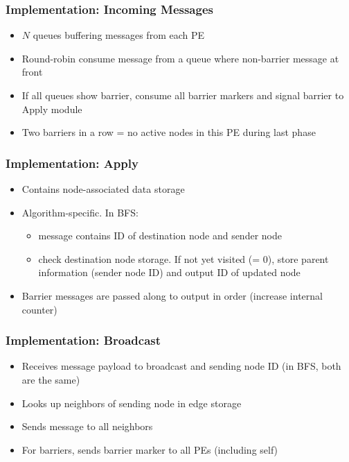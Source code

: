\documentclass[14pt]{beamer}
\begin{document}
\begin{frame}
\begin{minipage}{0.3\textwidth}
	\end{minipage}
\end{frame}

\begin{frame}
	\frametitle{Implementation: Incoming Messages}
	\begin{itemize}
		\addtolength{\itemsep}{0.5\baselineskip}
		\item $N$ queues buffering messages from each PE
		\item Round-robin consume message from a queue where non-barrier message at front
		\item If all queues show barrier, consume all barrier markers and signal barrier to Apply module
		\item Two barriers in a row = no active nodes in this PE during last phase
	\end{itemize}
\end{frame}

\begin{frame}
	\frametitle{Implementation: Apply}
	\begin{itemize}
		\addtolength{\itemsep}{0.5\baselineskip}
		\item Contains node-associated data storage
		\item Algorithm-specific. In BFS:
		\begin{itemize}
			\item message contains ID of destination node and sender node
			\item check destination node storage. If not yet visited (= 0), store parent information (sender node ID) and output ID of updated node
		\end{itemize}
		\item Barrier messages are passed along to output in order (increase internal counter)
	\end{itemize}
\end{frame}

\begin{frame}
	\frametitle{Implementation: Broadcast}
	\begin{itemize}
		\addtolength{\itemsep}{0.5\baselineskip}
		\item Receives message payload to broadcast and sending node ID (in BFS, both are the same)
		\item Looks up neighbors of sending node in edge storage
		\item Sends message to all neighbors
		\item For barriers, sends barrier marker to all PEs (including self)
	\end{itemize}
\end{frame}
\end{document}
